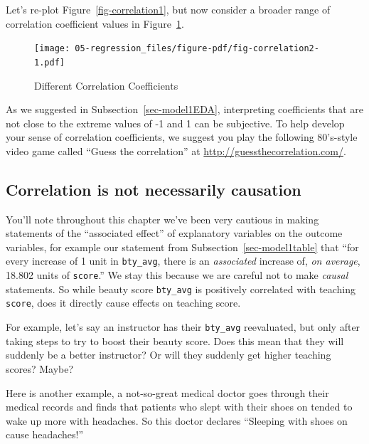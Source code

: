 \documentclass[
  letterpaper,
  DIV=11,
  numbers=noendperiod]{scrreprt}
\theoremstyle{definition}
\theoremstyle{remark}
\begin{document}
Let's re-plot Figure~\ref{fig-correlation1}, but now consider a broader
range of correlation coefficient values in
Figure~\ref{fig-correlation2}.

\begin{figure}

{\centering \texttt{[image: 05-regression\_files/figure-pdf/fig-correlation2-1.pdf]}

}

\caption{\label{fig-correlation2}Different Correlation Coefficients}

\end{figure}

As we suggested in Subsection~\ref{sec-model1EDA}, interpreting
coefficients that are not close to the extreme values of -1 and 1 can be
subjective. To help develop your sense of correlation coefficients, we
suggest you play the following 80's-style video game called ``Guess the
correlation'' at \url{http://guessthecorrelation.com/}.

\hypertarget{sec-correlation-is-not-causation}{%
\subsection{Correlation is not necessarily
causation}\label{sec-correlation-is-not-causation}}

You'll note throughout this chapter we've been very cautious in making
statements of the ``associated effect'' of explanatory variables on the
outcome variables, for example our statement from
Subsection~\ref{sec-model1table} that ``for every increase of 1 unit in
\texttt{bty\_avg}, there is an \emph{associated} increase of, \emph{on
average}, 18.802 units of \texttt{score}.'' We stay this because we are
careful not to make \emph{causal} statements. So while beauty score
\texttt{bty\_avg} is positively correlated with teaching \texttt{score},
does it directly cause effects on teaching score.

For example, let's say an instructor has their \texttt{bty\_avg}
reevaluated, but only after taking steps to try to boost their beauty
score. Does this mean that they will suddenly be a better instructor? Or
will they suddenly get higher teaching scores? Maybe?

Here is another example, a not-so-great medical doctor goes through
their medical records and finds that patients who slept with their shoes
on tended to wake up more with headaches. So this doctor declares
``Sleeping with shoes on cause headaches!''
\end{document}
